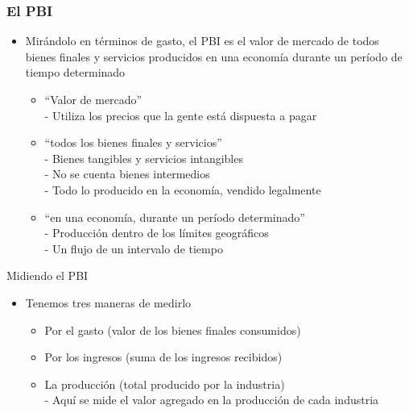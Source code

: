 \documentclass{beamer}
\begin{document}
\begin{frame}
\frametitle{ El PBI}
\begin{itemize}
        \item Mirándolo en términos de gasto, el PBI es el valor de mercado de todos bienes finales y servicios producidos en una economía durante un período de tiempo determinado \vspace{1mm}
        \begin{itemize}
            \item ``Valor de mercado'' \\ 
            - Utiliza los precios que la gente está dispuesta a pagar \vspace{1mm}
            \item ``todos los bienes finales y servicios'' \\
            - Bienes tangibles y servicios intangibles \\
            - No se cuenta bienes intermedios \\
            - Todo lo producido en la economía, vendido legalmente \\ \vspace{1mm}
            \item ``en una economía, durante un período determinado'' \\
            - Producción dentro de los límites geográficos \\
            - Un flujo de un intervalo de tiempo \\ 
        \end{itemize}
\end{itemize}
\end{frame}


\begin{frame}{ Midiendo el PBI}
    \begin{itemize}
        \item Tenemos tres maneras de medirlo \vspace{1mm}
       \begin{itemize}
           \item Por el gasto (valor de los bienes finales consumidos) \vspace{1mm}
           \item Por los ingresos (suma de los ingresos recibidos) \vspace{1mm}
           \item La producción (total producido por la industria) \\
            - Aquí se mide el valor agregado en la producción de cada industria
       \end{itemize}
    \end{itemize}
\end{frame}
\end{document}
